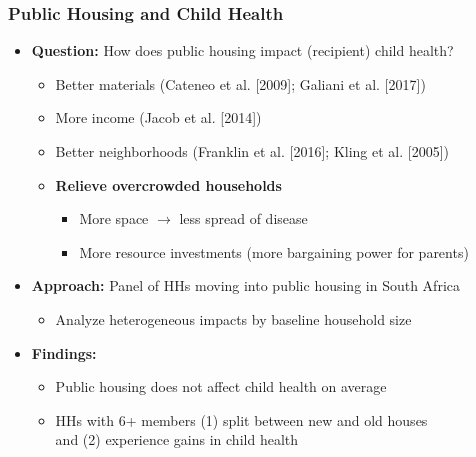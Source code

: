 \documentclass[aspectratio=149]{beamer}
\begin{document}
\begin{frame}
\frametitle{Public Housing and Child Health}

\begin{itemize}
\item \textbf{Question:} How does public housing impact (recipient) child health?
\vspace{.1cm}
  \begin{itemize}
  \item Better materials (Cateneo et al. [2009]; Galiani et al. [2017])
  \vspace{.05cm}
  \item More income (Jacob et al. [2014])
  \vspace{.05cm}
  \item Better neighborhoods (Franklin et al. [2016]; Kling et al. [2005])
  \vspace{.1cm}
  \item \textbf{Relieve overcrowded households}
    \begin{itemize}
      \item More space $\rightarrow$ less spread of disease
      \item More resource investments (more bargaining power for parents)
    \end{itemize}
  \end{itemize}

\vspace{.1cm}
\item \textbf{Approach:} Panel of HHs moving into public housing in South Africa
  \begin{itemize}
    \item Analyze heterogeneous impacts by baseline household size
  \end{itemize}
\vspace{.1cm}

\item \textbf{Findings:}
  \begin{itemize}
    \item Public housing does not affect child health on average
    \item HHs with 6+ members (1) split between new and old houses \\ and (2) experience gains in child health
  \end{itemize}
\end{itemize}

\end{frame}

\end{document}
